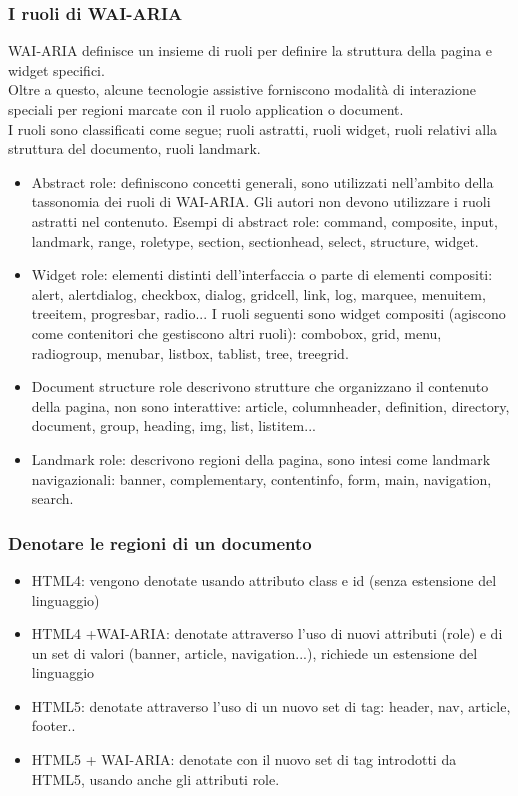 \documentclass{article}
\begin{document}
\subsubsection{I ruoli di WAI-ARIA}
WAI-ARIA definisce un insieme di ruoli per definire la struttura della pagina e widget specifici.\\
Oltre a questo, alcune tecnologie assistive forniscono modalità di interazione speciali per regioni marcate con il ruolo application o document.\\
I ruoli sono classificati come segue; ruoli astratti, ruoli widget, ruoli relativi alla struttura del documento, ruoli landmark.
\begin{itemize}
	\item Abstract role: definiscono concetti generali, sono utilizzati nell'ambito della tassonomia dei ruoli di WAI-ARIA. Gli autori non devono utilizzare i ruoli astratti nel contenuto. Esempi di abstract role: command, composite, input, landmark, range, roletype, section, sectionhead, select, structure, widget.
	\item Widget role: elementi distinti dell'interfaccia o parte di elementi compositi: alert, alertdialog, checkbox, dialog, gridcell, link, log, marquee, menuitem, treeitem, progresbar, radio...
	I ruoli seguenti sono widget compositi (agiscono come contenitori che gestiscono altri ruoli): combobox, grid, menu, radiogroup, menubar, listbox, tablist, tree, treegrid.
	\item Document structure role descrivono strutture che organizzano il contenuto della pagina, non sono interattive: article, columnheader, definition, directory, document, group, heading, img, list, listitem...
	\item Landmark role: descrivono regioni della pagina, sono intesi come landmark navigazionali: banner, complementary, contentinfo, form, main, navigation, search.
\end{itemize}
\subsubsection{Denotare le regioni di un documento}
\begin{itemize}
	\item HTML4: vengono denotate usando attributo class e id (senza estensione del linguaggio)
	\item HTML4 +WAI-ARIA: denotate attraverso l'uso di nuovi attributi (role) e di un set di valori (banner, article, navigation...), richiede un estensione del linguaggio
	\item HTML5: denotate attraverso l'uso di un nuovo set di tag: header, nav, article, footer.. 
	\item HTML5 + WAI-ARIA: denotate con il nuovo set di tag introdotti da HTML5, usando anche gli attributi role.
\end{itemize}
\end{document}
